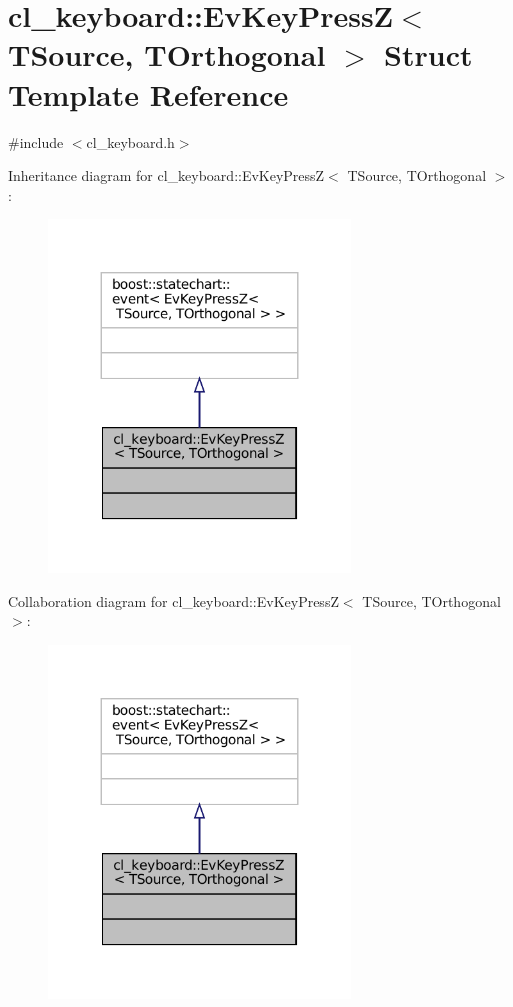 \hypertarget{structcl__keyboard_1_1EvKeyPressZ}{}\section{cl\+\_\+keyboard\+:\+:Ev\+Key\+PressZ$<$ T\+Source, T\+Orthogonal $>$ Struct Template Reference}
\label{structcl__keyboard_1_1EvKeyPressZ}


{\ttfamily \#include $<$cl\+\_\+keyboard.\+h$>$}



Inheritance diagram for cl\+\_\+keyboard\+:\+:Ev\+Key\+PressZ$<$ T\+Source, T\+Orthogonal $>$\+:
\nopagebreak
\begin{figure}[H]
\begin{center}
\leavevmode
\includegraphics[width=227pt]{structcl__keyboard_1_1EvKeyPressZ__inherit__graph}
\end{center}
\end{figure}


Collaboration diagram for cl\+\_\+keyboard\+:\+:Ev\+Key\+PressZ$<$ T\+Source, T\+Orthogonal $>$\+:
\nopagebreak
\begin{figure}[H]
\begin{center}
\leavevmode
\includegraphics[width=227pt]{structcl__keyboard_1_1EvKeyPressZ__coll__graph}
\end{center}
\end{figure}


